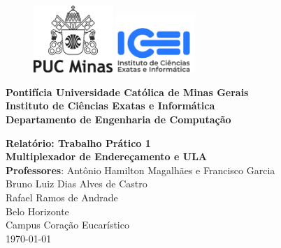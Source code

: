 \thispagestyle{empty} %

\begin{figure}[t]
    \includegraphics[width=3cm]{images/logo-puc-minas.png}
    \hspace{0.02\textwidth}
    \vline%
    \hspace{0.04\textwidth}
    \includegraphics[width=3cm]{images/logo-icei.jpeg}
\end{figure}

\hrulefill%
\vspace{\baselineskip}

\Large\noindent
\textbf{Pontifícia Universidade Católica de Minas Gerais} \\
\textbf{Instituto de Ciências Exatas e Informática} \\
\textbf{Departamento de Engenharia de Computação}

\begin{center}
    \vfill
    \Huge\textbf{Relatório: Trabalho Prático 1} \\
    \vspace{0.5cm}
    \Large\textbf{Multiplexador de Endereçamento e ULA} \\
    \vspace{1cm}
    \large \textbf{Professores}: Antônio Hamilton Magalhães e Francisco Garcia\\
    \vspace{0.5cm}
    \large Bruno Luiz Dias Alves de Castro \\
    \large Rafael Ramos de Andrade \\
    \vfill
    \large Belo Horizonte \\ Campus Coração Eucarístico \\
    \vspace{\baselineskip}
    \large \today
\end{center}